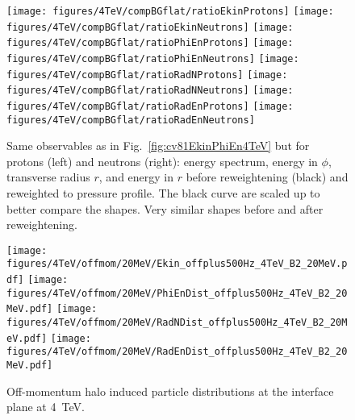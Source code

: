 \begin{figure}
\begin{center}
  \texttt{[image: figures/4TeV/compBGflat/ratioEkinProtons]}
  \texttt{[image: figures/4TeV/compBGflat/ratioEkinNeutrons]}
  \texttt{[image: figures/4TeV/compBGflat/ratioPhiEnProtons]}
  \texttt{[image: figures/4TeV/compBGflat/ratioPhiEnNeutrons]}
  \texttt{[image: figures/4TeV/compBGflat/ratioRadNProtons]}
  \texttt{[image: figures/4TeV/compBGflat/ratioRadNNeutrons]}
  \texttt{[image: figures/4TeV/compBGflat/ratioRadEnProtons]}
  \texttt{[image: figures/4TeV/compBGflat/ratioRadEnNeutrons]}
\end{center}
\vspace{-0.6cm}
 \caption{Same observables as in Fig.~\ref{fig:cv81EkinPhiEn4TeV} but for protons (left) and neutrons (right): energy spectrum, energy in $\phi$, transverse radius $r$, and energy in $r$ before reweightening (black) and reweighted to pressure profile. The black curve are scaled up to better compare the shapes. Very similar shapes before and after reweightening.
   \label{fig:cv81ProtNeut4TeV}}
\end{figure}



\begin{figure}
  \begin{center}
    \texttt{[image: figures/4TeV/offmom/20MeV/Ekin\_offplus500Hz\_4TeV\_B2\_20MeV.pdf]}
    \texttt{[image: figures/4TeV/offmom/20MeV/PhiEnDist\_offplus500Hz\_4TeV\_B2\_20MeV.pdf]}
  \texttt{[image: figures/4TeV/offmom/20MeV/RadNDist\_offplus500Hz\_4TeV\_B2\_20MeV.pdf]}
  \texttt{[image: figures/4TeV/offmom/20MeV/RadEnDist\_offplus500Hz\_4TeV\_B2\_20MeV.pdf]}

\end{center}
\vspace{-0.6cm}
 \caption{Off-momentum halo induced particle distributions at the interface plane at 4~TeV.
  \label{offmom4TeV2}}
\end{figure}




